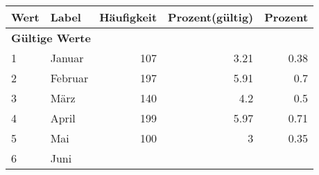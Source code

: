      \begin{longtable}{lXrrr}
     \toprule
     \textbf{Wert} & \textbf{Label} & \textbf{Häufigkeit} & \textbf{Prozent(gültig)} & \textbf{Prozent} \\
     \endhead
     \midrule
     \multicolumn{5}{l}{\textbf{Gültige Werte}}\\

     1 &
     \multicolumn{1}{X}{ Januar   } &


       \num{107} &
       \num[round-mode=places,round-precision=2]{3.21} &
         \num[round-mode=places,round-precision=2]{0.38} \\

     2 &
     \multicolumn{1}{X}{ Februar   } &


       \num{197} &
       \num[round-mode=places,round-precision=2]{5.91} &
         \num[round-mode=places,round-precision=2]{0.7} \\

     3 &
     \multicolumn{1}{X}{ März   } &


       \num{140} &
       \num[round-mode=places,round-precision=2]{4.2} &
         \num[round-mode=places,round-precision=2]{0.5} \\

     4 &
     \multicolumn{1}{X}{ April   } &


       \num{199} &
       \num[round-mode=places,round-precision=2]{5.97} &
         \num[round-mode=places,round-precision=2]{0.71} \\

     5 &
     \multicolumn{1}{X}{ Mai   } &


       \num{100} &
       \num[round-mode=places,round-precision=2]{3} &
         \num[round-mode=places,round-precision=2]{0.35} \\

     6 &
     \multicolumn{1}{X}{ Juni   } &



\end{longtable}
